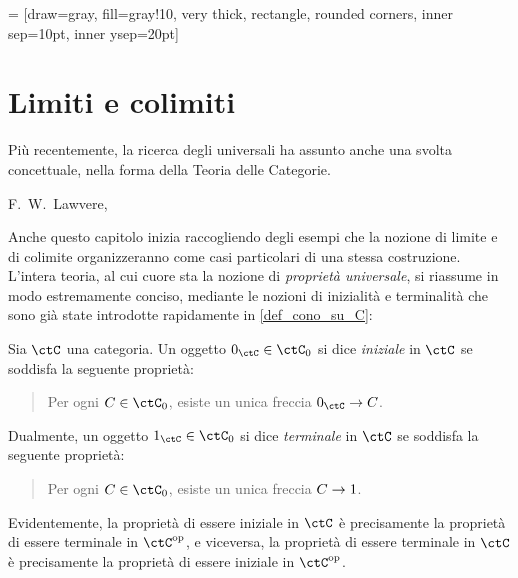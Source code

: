  = [draw=gray, fill=gray!10, very thick,
rectangle, rounded corners, inner sep=10pt, inner ysep=20pt]
\chapter{Limiti e colimiti}\label{chap_limiti_colimiti}
\epigraph{Più recentemente, la ricerca degli universali ha assunto anche una svolta concettuale, nella forma della Teoria delle Categorie.}{F.\ W.\ Lawvere, \cite{lawvere1969adjointness}}



Anche questo capitolo inizia raccogliendo degli esempi che la nozione di limite e di colimite organizzeranno come casi particolari di una stessa costruzione. L'intera teoria, al cui cuore sta la nozione di \emph{proprietà universale}, si riassume in modo estremamente conciso, mediante le nozioni di inizialità e terminalità che sono già state introdotte rapidamente in \ref{def_cono_su_C}:
\begin{definition}
	Sia \(\ctC\) una categoria. Un oggetto \(\init_\ctC\in\ctC_0\) si dice \emph{iniziale} in \(\ctC\) se soddisfa la seguente proprietà:
	\begin{quote}
		Per ogni \(C\in\ctC_0\), esiste un unica freccia \(\init_\ctC \to C\).
	\end{quote}
	Dualmente, un oggetto \(\term_\ctC\in\ctC_0\) si dice \emph{terminale} in \(\ctC\) se soddisfa la seguente proprietà:
	\begin{quote}
		Per ogni \(C\in\ctC_0\), esiste un unica freccia \(C\to1\).
	\end{quote}
\end{definition}
Evidentemente, la proprietà di essere iniziale in \(\ctC\) è precisamente la proprietà di essere terminale in \(\ctC^\op\), e viceversa, la proprietà di essere terminale in \(\ctC\) è precisamente la proprietà di essere iniziale in \(\ctC^\op\).

